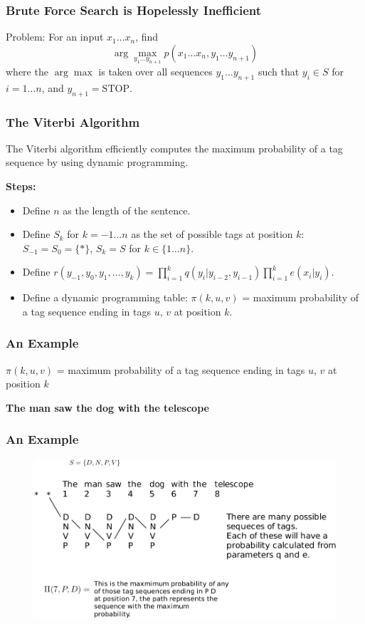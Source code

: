 \documentclass[handout]{beamer}
\begin{document}
\begin{frame}
  \frametitle{Brute Force Search is Hopelessly Inefficient}
  Problem: For an input $x_1 \ldots x_n$, find
  \[
    \arg \max_{y_1 \ldots y_{n+1}} p(x_1 \ldots x_n, y_1 \ldots y_{n+1})
  \]
  where the $\arg \max$ is taken over all sequences $y_1 \ldots y_{n+1}$ such that $y_i \in S$ for $i = 1 \ldots n$, and $y_{n+1} = \text{STOP}$.
\end{frame}

\begin{frame}
  \frametitle{The Viterbi Algorithm}
  The Viterbi algorithm efficiently computes the maximum probability of a tag sequence by using dynamic programming.

  \textbf{Steps:}
  \begin{itemize}
    \item Define $n$ as the length of the sentence.
    \item Define $S_k$ for $k = -1 \ldots n$ as the set of possible tags at position $k$: $S_{-1} = S_0 = \{*\}$, $S_k = S$ for $k \in \{1 \ldots n\}$.
    \item Define $r(y_{-1}, y_0, y_1, \ldots, y_k) = \prod_{i=1}^k q(y_i|y_{i-2}, y_{i-1}) \prod_{i=1}^k e(x_i|y_i)$.
    \item Define a dynamic programming table: $\pi(k, u, v)$ = maximum probability of a tag sequence ending in tags $u$, $v$ at position $k$.
  \end{itemize}
\end{frame}

\begin{frame}
  \frametitle{An Example}
  $\pi(k, u, v)$ = maximum probability of a tag sequence ending in tags $u$, $v$ at position $k$

  \textbf{The man saw the dog with the telescope}




\end{frame}


\begin{frame}
  \frametitle{An Example}

  \begin{figure}[h]
        	\includegraphics[scale = 0.7]{pics/viterbi1.pdf}
        \end{figure}



\end{frame}
\end{document}
